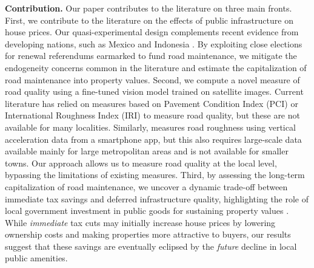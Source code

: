 {\bf Contribution.} 
Our paper contributes to the literature on three main fronts. 
First, we contribute to the literature on the effects of public infrastructure on house prices. Our quasi-experimental design complements recent evidence from developing nations, such as Mexico \citep{gonzalez2016paving} and Indonesia \citep{gertler2024road}. By exploiting close elections for renewal referendums earmarked to fund road maintenance, we mitigate the endogeneity concerns common in the literature and estimate the capitalization of road maintenance into property values.
Second, we compute a novel measure of road quality using a fine-tuned vision model trained on satellite images. Current literature has relied on measures based on Pavement Condition Index (PCI) or International Roughness Index (IRI) to measure road quality, but these are not available for many localities. Similarly, \cite{currier2023} measures road roughness using vertical acceleration data from a smartphone app, but this also requires large-scale data available mainly for large metropolitan areas and is not available for smaller towns. Our approach allows us to measure road quality at the local level, bypassing the limitations of existing measures. 
Third, by assessing the long-term capitalization of road maintenance, we uncover a dynamic trade-off between immediate tax savings and deferred infrastructure quality, highlighting the role of local government investment in public goods for sustaining property values \citep{Oates1972,rioja2003}. While \textit{immediate} tax cuts may initially increase house prices by lowering ownership costs and making properties more attractive to buyers, our results suggest that these savings are eventually eclipsed by the \textit{future} decline in local public amenities. 


